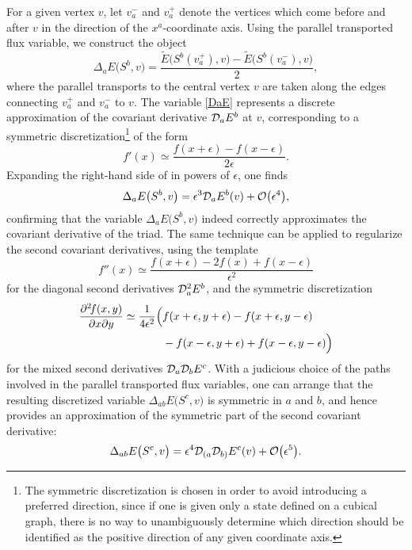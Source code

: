 \documentclass{appolb_edited}
\newcommand{\D}{{\cal D}}
\newcommand{\Et}{\widetilde E}
\begin{document}
For a given vertex $v$, let $v_a^-$ and $v_a^+$ denote the vertices which come before and after $v$ in the direction of the $x^a$-coordinate axis. Using the parallel transported flux variable, we construct the object
\begin{equation}
	\Delta_aE\bigl(S^b, v\bigr) = \frac{\Et\bigl(S^b(v_a^+), v\bigr) - \Et\bigl(S^b(v_a^-), v\bigr)}{2},
	\label{DaE}
\end{equation}
where the parallel transports to the central vertex $v$ are taken along the edges connecting $v_a^+$ and $v_a^-$ to $v$. The variable \eqref{DaE} represents a discrete approximation of the covariant derivative $\D_aE^b$ at $v$, corresponding to a symmetric discretization\footnote{
	The symmetric discretization is chosen in order to avoid introducing a preferred direction, since if one is given only a state defined on a cubical graph, there is no way to unambiguously determine which direction should be identified as the positive direction of any given coordinate axis.
}
of the form
\begin{equation}
	f'(x) \simeq \frac{f(x+\epsilon) - f(x-\epsilon)}{2\epsilon}.
	\label{f' sym}
\end{equation}
Expanding the right-hand side of  in powers of $\epsilon$, one finds
\begin{equation}
	\Delta_aE\bigl(S^b, v\bigr) = \epsilon^3\D_aE^b(v) + {\cal O}\bigl(\epsilon^4\bigr),
	\label{}
\end{equation}
confirming that the variable $\Delta_aE\bigl(S^b, v\bigr)$ indeed correctly approximates the covariant derivative of the triad. The same technique can be applied to regularize the second covariant derivatives, using the template
\begin{equation}
	f''(x) \simeq \frac{f(x+\epsilon) - 2f(x) + f(x-\epsilon)}{\epsilon^2}
	\label{f''}
\end{equation}
for the diagonal second derivatives $\D_a^2E^b$, and the symmetric discretization
\begin{align}
	\frac{\partial^2\!f(x,y)}{\partial x\partial y} \simeq \frac{1}{4\epsilon^2}\Bigl(&f(x+\epsilon, y+\epsilon) - f(x+\epsilon, y-\epsilon) \notag \\
	&- f(x-\epsilon, y+\epsilon) + f(x-\epsilon, y-\epsilon)\Bigr)
	\label{f_xy}
\end{align}
for the mixed second derivatives $\D_a\D_bE^c$. With a judicious choice of the paths involved in the parallel transported flux variables, one can arrange that the resulting discretized variable $\Delta_{ab}E\bigl(S^c, v\bigr)$ is symmetric in $a$ and $b$, and hence provides an approximation of the symmetric part of the second covariant derivative:
\begin{equation}
	\Delta_{ab}E\bigl(S^c, v\bigr) = \epsilon^4\D_{(a}\D_{b)}E^c(v) + {\cal O}\bigl(\epsilon^5\bigr).
	\label{}
\end{equation}
\end{document}
